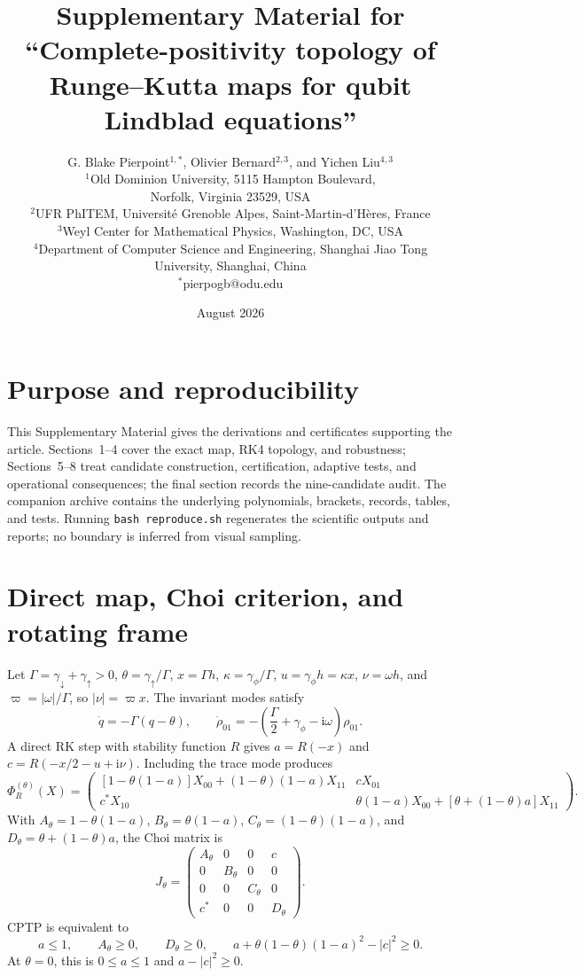\documentclass[11pt]{article}
\title{Supplementary Material for\\[3pt]\large ``Complete-positivity topology of Runge--Kutta maps for qubit Lindblad equations''}
\author{\begin{minipage}{0.92\textwidth}\centering
G. Blake Pierpoint$^{1,*}$, Olivier Bernard$^{2,3}$, and Yichen Liu$^{4,3}$\\[5pt]
\small $^1$Old Dominion University, 5115 Hampton Boulevard,\\[-1pt]
\small Norfolk, Virginia 23529, USA\\
\small $^2$UFR PhITEM, Universit\'e Grenoble Alpes, Saint-Martin-d'H\`eres, France\\
\small $^3$Weyl Center for Mathematical Physics, Washington, DC, USA\\
\small $^4$Department of Computer Science and Engineering, Shanghai Jiao Tong University, Shanghai, China\\[2pt]
\small $^*$pierpogb@odu.edu
\end{minipage}}
\date{August 2026}
\newcommand{\ii}{\mathrm{i}}
\begin{document}
\renewcommand{\thefigure}{S\arabic{figure}}
\maketitle

\section*{Purpose and reproducibility}
This Supplementary Material gives the derivations and certificates supporting the article. Sections~1--4 cover the exact map, RK4 topology, and robustness; Sections~5--8 treat candidate construction, certification, adaptive tests, and operational consequences; the final section records the nine-candidate audit. The companion archive contains the underlying polynomials, brackets, records, tables, and tests. Running \texttt{bash reproduce.sh} regenerates the scientific outputs and reports; no boundary is inferred from visual sampling.

\section{Direct map, Choi criterion, and rotating frame}
Let $\Gamma=\gamma_\downarrow+\gamma_\uparrow>0$, $\theta=\gamma_\uparrow/\Gamma$, $x=\Gamma h$, $\kappa=\gamma_\phi/\Gamma$, $u=\gamma_\phi h=\kappa x$, $\nu=\omega h$, and $\varpi=|\omega|/\Gamma$, so $|\nu|=\varpi x$. The invariant modes satisfy
\begin{equation}
 \dot q=-\Gamma(q-\theta),\qquad
 \dot\rho_{01}=-\left(\frac\Gamma2+\gamma_\phi-\ii\omega\right)\rho_{01}.
\end{equation}
A direct RK step with stability function $R$ gives $a=R(-x)$ and $c=R(-x/2-u+\ii\nu)$. Including the trace mode produces
\begin{equation}
 \Phi_R^{(\theta)}(X)=
 \begin{pmatrix}
 [1-\theta(1-a)]X_{00}+(1-\theta)(1-a)X_{11} & cX_{01}\\
 c^*X_{10} & \theta(1-a)X_{00}+[\theta+(1-\theta)a]X_{11}
 \end{pmatrix}.
\end{equation}
With $A_\theta=1-\theta(1-a)$, $B_\theta=\theta(1-a)$, $C_\theta=(1-\theta)(1-a)$, and $D_\theta=\theta+(1-\theta)a$, the Choi matrix is
\begin{equation}
 J_\theta=\begin{pmatrix}A_\theta&0&0&c\\0&B_\theta&0&0\\0&0&C_\theta&0\\c^*&0&0&D_\theta\end{pmatrix}.
\end{equation}
CPTP is equivalent to
\begin{equation}
 a\le1,\qquad A_\theta\ge0,\qquad D_\theta\ge0,\qquad
 a+\theta(1-\theta)(1-a)^2-|c|^2\ge0.
\end{equation}
At $\theta=0$, this is $0\le a\le1$ and $a-|c|^2\ge0$.
\end{document}
